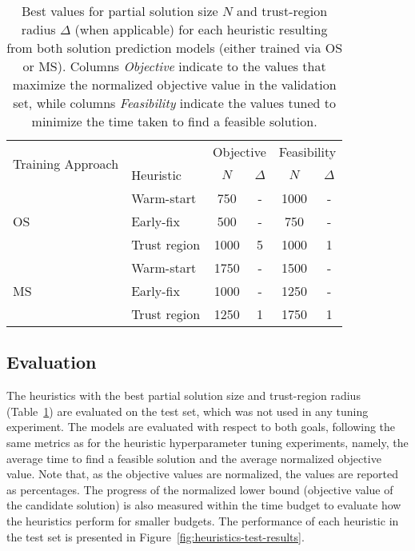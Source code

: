 \begin{table}[h]
    \centering
    \caption{%
	Best values for partial solution size $N$ and trust-region radius $\Delta$ (when applicable) for each heuristic resulting from both solution prediction models (either trained via OS or MS).
	Columns \emph{Objective} indicate to the values that maximize the normalized objective value in the validation set, while columns \emph{Feasibility} indicate the values tuned to minimize the time taken to find a feasible solution.
 }
    \label{tab:best-N-delta}
    \begin{tabular}{ll|cc|cc}
    \toprule
    \multirow{2}{2cm}{Training Approach} & & \multicolumn{2}{c|}{Objective} & \multicolumn{2}{c}{Feasibility} \\
                            & Heuristic    & $N$         & $\Delta$        & $N$          & $\Delta$         \\
    \midrule
    \multirow{3}{*}{OS}      & Warm-start   & 750         & -               & 1000         & -                \\
                                        & Early-fix    & 500         & -               & 750          & -                \\
                                        & Trust region & 1000        & 5               & 1000         & 1                \\
    \midrule
    \multirow{3}{*}{MS} & Warm-start   & 1750        & -               & 1500         & -                \\
                                        & Early-fix    & 1000        & -               & 1250         & -                \\
                                        & Trust region & 1250        & 1               & 1750         & 1             \\
    \bottomrule 
    \end{tabular}
\end{table}

\subsection{Evaluation}

The heuristics with the best partial solution size and trust-region radius (Table~\ref{tab:best-N-delta}) are evaluated on the test set, which was not used in any tuning experiment.
The models are evaluated with respect to both goals, following the same metrics as for the heuristic hyperparameter tuning experiments, namely, the average time to find a feasible solution and the average normalized objective value.
Note that, as the objective values are normalized, the values are reported as percentages.
The progress of the normalized lower bound (objective value of the candidate solution) is also measured within the time budget to evaluate how the heuristics perform for smaller budgets.
The performance of each heuristic in the test set is presented in Figure~\ref{fig:heuristics-test-results}.


